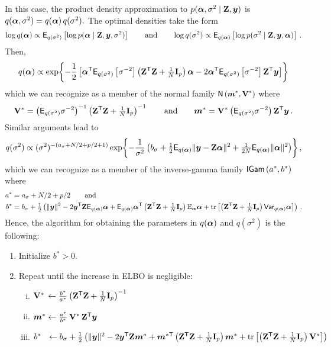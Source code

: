 \documentclass[letterpaper,10pt,openany]{article}
\def\exp#1{{\rm exp}{#1}}
\def\frac#1#2{{{#1}\over{#2}}}
\DeclareMathOperator*{\tr}{tr}
\newcommand{\ex}[1]{\exp{ \left\{ #1 \right\}}}
\def\I{\mathbf{I}}\def\i{\mathbf{i}}\def\Iv{\boldsymbol{I}}\def\iv{\boldsymbol{i}}
\def\V{\mathbf{V}}\def\v{\mathbf{v}}\def\Vv{\boldsymbol{V}}\def\vv{\boldsymbol{v}}
\def\Z{\mathbf{Z}}\def\z{\mathbf{z}}\def\Zv{\boldsymbol{Z}}\def\zv{\boldsymbol{z}}
\def\sig{\sigma}\def\sigv{\boldsymbol{\sigma}}
\def\Nor{\small{\mathsf{N}}}
\def\IGamd{\small{\mathsf{IGam}}}
\def\trans{\text{\textsf{T}}}
\begin{document}
In this case, the product density approximation to $p(\alv, \sig^2\mid\Z,\yv)$ is
$
q(\alv, \sig^2) = q(\alv)\,q(\sig^2).
$
The optimal densities take the form
$$
\log q(\alv)   \propto \textsf{E}_{q(\sig^2)}\left[ \log p(\alv  \mid\Z,\yv,\sig^2) \right] \qquad\text{and}\qquad
\log q(\sig^2) \propto \textsf{E}_{q(\alv)}  \left[ \log p(\sig^2\mid\Z,\yv,\alv) \right] \,.
$$
Then,
$$
q(\alv)
\propto
\ex{ -\frac{1}{2} \left[ \alv^\trans \textsf{E}_{q(\sig^2)}\left[\sig^{-2}\right]\left(\Z^\trans\Z + \tfrac{1}{N}\I_p  \right)\alv -2\alv^\trans\textsf{E}_{q(\sig^2)}\left[\sig^{-2}\right]\Z^\trans\yv \right] }
$$
which we can recognize as a member of the normal family
$
\Nor\left( \mv^* , \V^* \right)
$
where
$$
\V^*  = \left(\textsf{E}_{q(\sig^2)}\sig^{-2}\right)^{-1}\left( \Z^\trans\Z + \tfrac{1}{N}\I_p \right)^{-1} \qquad\text{and}\qquad
\mv^* = \V^*\left(\textsf{E}_{q(\sig^2)}\sig^{-2}\right)\Z^\trans\yv\,.
$$
Similar arguments lead to
$$
q(\sig^2) 
\propto (\sig^2)^{-(a_\sig+N/2+p/2 + 1)}\, \ex{ -\frac{1}{\sig^2}\left(b_\sig + \tfrac12\textsf{E}_{q(\alv)} \|\yv-\Z\alv\|^2 + \tfrac{1}{2N}\textsf{E}_{q(\alv)} \|\alv\|^2\right) }\,,
$$
which we can recognize as a member of the inverse-gamma family 
$
\IGamd \left( a^* , b^* \right)
$
where
\begin{align*}
a^* &= a_\sig+N/2+p/2 \qquad\text{and}\qquad \\
b^* &= b_\sig + \tfrac12 \left( \|\yv\|^2 -2\yv^\trans\Z\textsf{E}_{q(\alv)}\alv + \textsf{E}_{q(\alv)}\alv^\trans\left( \Z^\trans\Z + \tfrac{1}{N}\I_p \right)\mathbb{E}_{\alv}\alv + \tr\left[\left( \Z^\trans\Z + \tfrac{1}{N}\I_p \right) \textsf{Var}_{q(\alv)}\alv \right] \right)\,.
\end{align*}
Hence, the algorithm for obtaining the parameters in $q(\boldsymbol{\alpha})$ and $q(\sig^2)$ is the following:
\begin{enumerate}
	\item Initialize $b^* > 0$.
	\item Repeat until the increase in \textsf{ELBO} is negligible:
	\begin{enumerate}[i.]
		\item $\V^*  \,\leftarrow \frac{b^*}{a^*}\left( \Z^\trans\Z + \tfrac{1}{N}\I_p \right)^{-1}$
		\item $\mv^* \leftarrow \frac{a^*}{b^*}\,\V^*\,\Z^\trans\yv$
		\item $b^*   \,\,\,\,\leftarrow  b_\sig + \tfrac12 \left( \|\yv\|^2 -2\yv^\trans\Z\mv^* + \mv^{*\trans}\left( \Z^\trans\Z + \tfrac{1}{N}\I_p \right)\mv^* + \tr\left[\left( \Z^\trans\Z + \tfrac{1}{N}\I_p \right) \V^* \right] \right)$
	\end{enumerate}
\end{enumerate}	
\end{document}
